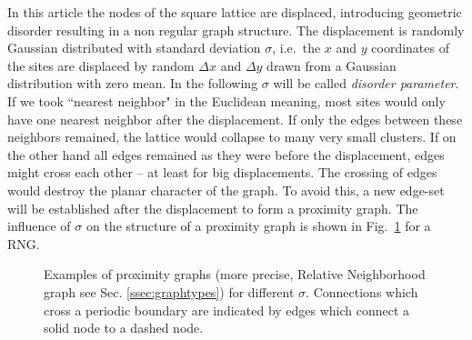     In this article the nodes of the square lattice are
    displaced, introducing geometric disorder resulting in a non regular graph
    structure.
    The displacement is randomly Gaussian distributed with standard
    deviation \(\sigma\), i.e.~the \(x\) and \(y\) coordinates of the
    sites are displaced by random \(\Delta x\) and \(\Delta y\) drawn
    from a Gaussian distribution with zero mean.
    In the following \(\sigma\) will be called \emph{disorder parameter}.
    If we took ``nearest neighbor" in the Euclidean meaning, most sites
    would only have one nearest neighbor after the
    displacement. If only the edges between these neighbors remained,
    the lattice would collapse to many very small clusters. If on the
    other hand all edges remained as they were before the displacement,
    edges might cross each other -- at least for big displacements.
    The crossing of edges would destroy the planar character of the graph.
    To avoid this, a new edge-set will be established after the displacement
    to form a proximity graph. The influence of $\sigma$ on the
    structure of a proximity graph is shown in Fig.~\ref{fig:RNG_sigma}
    for a RNG.
    \begin{figure}[htb]
        \centering
        \caption[Examples of RNG for different $\sigma$]
        {
            Examples of proximity graphs (more precise, Relative Neighborhood
            graph see Sec. \ref{ssec:graphtypes}) for different $\sigma$.
            Connections which cross a periodic boundary are indicated
            by edges which connect a solid node to a dashed node.
        }
        \label{fig:RNG_sigma}
    \end{figure}
